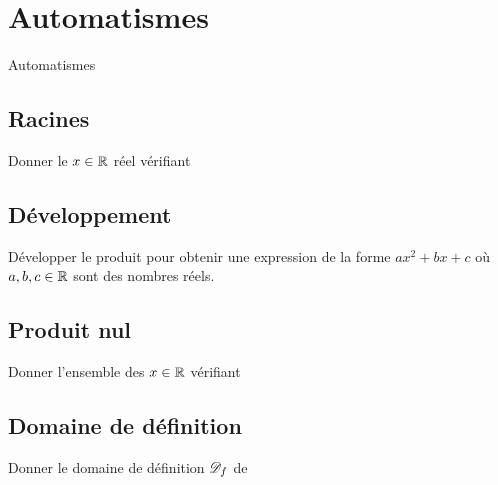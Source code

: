 
\AdvanceDate[3]



\section{Automatismes}

\begin{frame}

\centering \huge
Automatismes


\end{frame}

\subsection{Racines}

\begin{frame}{1}	
	Donner le $x\in\mathbb{R}$ réel vérifiant
	\boxAB{
			\[ 8x - 3 = 0. \]
	}{
			\[ 13x + 4 = 0. \]
	}
\end{frame}


\subsection{Développement}

\begin{frame}{2}	
	Développer le produit pour obtenir une expression de la forme $ax^2 + bx + c$ où $a, b, c \in\mathbb{R}$ sont des nombres réels.
	\boxAB{
			\[ (3x + 2)(2x - 1) \]
	}{
			\[ (x - 5)(6x + 3) \]
	}
\end{frame}

\subsection{Produit nul}

\begin{frame}{3}	
	Donner l'ensemble des $x\in\mathbb{R}$ vérifiant
	\boxAB{
			\[ (x-3)(x+2) = 0. \]
	}{
			\[ (x+1)(x-6) = 0. \]
	}
\end{frame}

\subsection{Domaine de définition}

\begin{frame}{4}	
	Donner le domaine de définition $\mathcal{D}_f$ de
	\boxAB{
			\[ f(x) = \dfrac{1}{x-17}. \]
	}{
			\[ f(x) = \dfrac{1}{12-x}. \]
	}
\end{frame}



